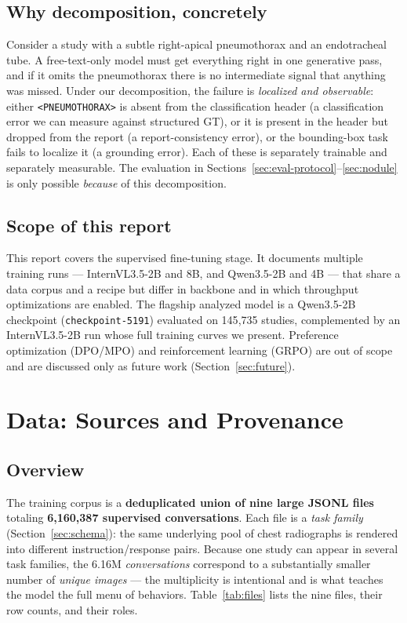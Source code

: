 \documentclass[11pt,a4paper]{article}
\begin{document}
\subsection{Why decomposition, concretely}
Consider a study with a subtle right-apical pneumothorax and an endotracheal tube. A free-text-only model must get everything right in one generative pass, and if it omits the pneumothorax there is no intermediate signal that anything was missed. Under our decomposition, the failure is \emph{localized and observable}: either \texttt{<PNEUMOTHORAX>} is absent from the classification header (a classification error we can measure against structured GT), or it is present in the header but dropped from the report (a report-consistency error), or the bounding-box task fails to localize it (a grounding error). Each of these is separately trainable and separately measurable. The evaluation in Sections~\ref{sec:eval-protocol}--\ref{sec:nodule} is only possible \emph{because} of this decomposition.

\subsection{Scope of this report}
This report covers the supervised fine-tuning stage. It documents multiple training runs --- InternVL3.5-2B and 8B, and Qwen3.5-2B and 4B --- that share a data corpus and a recipe but differ in backbone and in which throughput optimizations are enabled. The flagship analyzed model is a Qwen3.5-2B checkpoint (\texttt{checkpoint-5191}) evaluated on 145{,}735 studies, complemented by an InternVL3.5-2B run whose full training curves we present. Preference optimization (DPO/MPO) and reinforcement learning (GRPO) are out of scope and are discussed only as future work (Section~\ref{sec:future}).

\section{Data: Sources and Provenance}
\label{sec:data-sources}

\subsection{Overview}
The training corpus is a \textbf{deduplicated union of nine large JSONL files} totaling \textbf{6{,}160{,}387 supervised conversations}. Each file is a \emph{task family} (Section~\ref{sec:schema}): the same underlying pool of chest radiographs is rendered into different instruction/response pairs. Because one study can appear in several task families, the 6.16M \emph{conversations} correspond to a substantially smaller number of \emph{unique images} --- the multiplicity is intentional and is what teaches the model the full menu of behaviors. Table~\ref{tab:files} lists the nine files, their row counts, and their roles.
\end{document}

